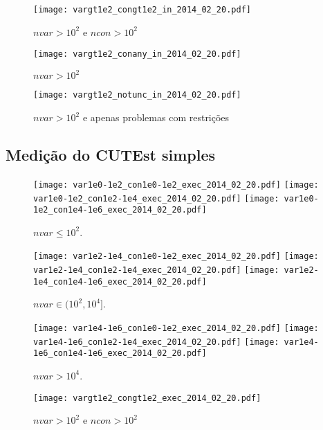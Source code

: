 \documentclass{article}
\begin{document}
\begin{figure}[H]
\centering
\texttt{[image: vargt1e2\_congt1e2\_in\_2014\_02\_20.pdf]}
\caption{ $nvar > 10^2$ e $ncon > 10^2$ }
\label{fig:both_medium_and_big}
\end{figure}

\begin{figure}[H]
\centering
\texttt{[image: vargt1e2\_conany\_in\_2014\_02\_20.pdf]}
\caption{ $nvar > 10^2$ }
\label{fig:nvar_medium_and_big}
\end{figure}

\begin{figure}[H]
\centering
\texttt{[image: vargt1e2\_notunc\_in\_2014\_02\_20.pdf]}
\caption{ $nvar > 10^2$ e apenas problemas com restrições }
\label{fig:nvar_medium_and_big_not_unc}
\end{figure}

\subsection{Medição do CUTEst simples}

\begin{figure}[H]
\centering
\texttt{[image: var1e0-1e2\_con1e0-1e2\_exec\_2014\_02\_20.pdf]}
\texttt{[image: var1e0-1e2\_con1e2-1e4\_exec\_2014\_02\_20.pdf]}
\texttt{[image: var1e0-1e2\_con1e4-1e6\_exec\_2014\_02\_20.pdf]}
\caption{ $nvar \leq 10^2$. }
\label{fig:nvar_small}
\end{figure}
\begin{figure}[H]
\centering
\texttt{[image: var1e2-1e4\_con1e0-1e2\_exec\_2014\_02\_20.pdf]}
\texttt{[image: var1e2-1e4\_con1e2-1e4\_exec\_2014\_02\_20.pdf]}
\texttt{[image: var1e2-1e4\_con1e4-1e6\_exec\_2014\_02\_20.pdf]}
\caption{ $nvar \in (10^2,10^4]$. }
\label{fig:nvar_medium}
\end{figure}
\begin{figure}[H]
\centering
\texttt{[image: var1e4-1e6\_con1e0-1e2\_exec\_2014\_02\_20.pdf]}
\texttt{[image: var1e4-1e6\_con1e2-1e4\_exec\_2014\_02\_20.pdf]}
\texttt{[image: var1e4-1e6\_con1e4-1e6\_exec\_2014\_02\_20.pdf]}
\caption{ $nvar > 10^4$. }
\label{fig:nvar_big}
\end{figure}

\begin{figure}[H]
\centering
\texttt{[image: vargt1e2\_congt1e2\_exec\_2014\_02\_20.pdf]}
\caption{ $nvar > 10^2$ e $ncon > 10^2$ }
\label{fig:both_medium_and_big}
\end{figure}
\end{document}
